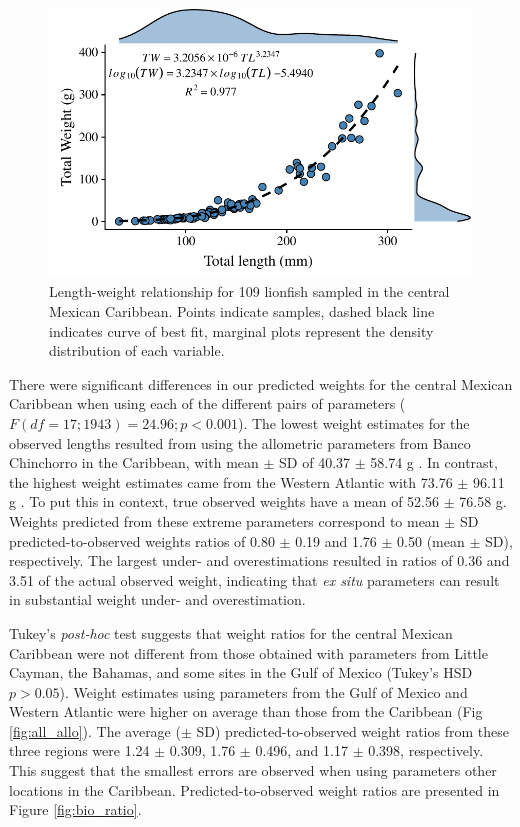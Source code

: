\documentclass[fleqn,10pt,lineno]{wlpeerj} %
\begin{document}
\begin{figure}
\centering
\includegraphics{Manuscript_files/figure-latex/fit1-1.pdf}
\caption{\label{fig:l-w-carib}Length-weight relationship for 109
lionfish sampled in the central Mexican Caribbean. Points indicate
samples, dashed black line indicates curve of best fit, marginal plots
represent the density distribution of each variable.}
\end{figure}

There were significant differences in our predicted weights for the
central Mexican Caribbean when using each of the different pairs of
parameters (\(F(df = 17; 1943) = 24.96; p < 0.001\)). The lowest weight
estimates for the observed lengths resulted from using the allometric
parameters from Banco Chinchorro in the Caribbean, with mean \(\pm\) SD
of 40.37 \(\pm\) 58.74 g \citep{sabidoitz_2016}. In contrast, the
highest weight estimates came from the Western Atlantic with 73.76
\(\pm\) 96.11 g \citep{barbour_2011}. To put this in context, true
observed weights have a mean of 52.56 \(\pm\) 76.58 g. Weights predicted
from these extreme parameters correspond to mean \(\pm\) SD
predicted-to-observed weights ratios of 0.80 \(\pm\) 0.19 and 1.76
\(\pm\) 0.50 (mean \(\pm\) SD), respectively. The largest under- and
overestimations resulted in ratios of 0.36 and 3.51 of the actual
observed weight, indicating that \emph{ex situ} parameters can result in
substantial weight under- and overestimation.

Tukey's \emph{post-hoc} test suggests that weight ratios for the central
Mexican Caribbean were not different from those obtained with parameters
from Little Cayman, the Bahamas, and some sites in the Gulf of Mexico
(Tukey's HSD \(p > 0.05\)). Weight estimates using parameters from the
Gulf of Mexico and Western Atlantic were higher on average than those
from the Caribbean (Fig \ref{fig:all_allo}). The average (\(\pm\) SD)
predicted-to-observed weight ratios from these three regions were 1.24
\(\pm\) 0.309, 1.76 \(\pm\) 0.496, and 1.17 \(\pm\) 0.398, respectively.
This suggest that the smallest errors are observed when using parameters
other locations in the Caribbean. Predicted-to-observed weight ratios
are presented in Figure \ref{fig:bio_ratio}.
\end{document}
